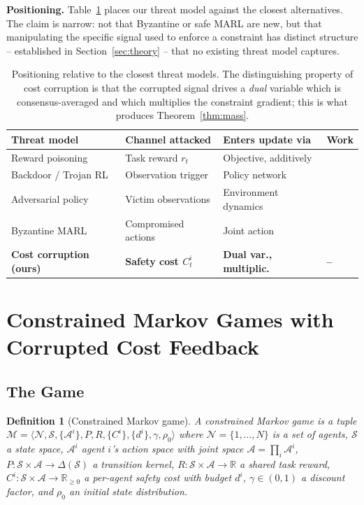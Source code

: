 \documentclass{article}
\newtheorem{definition}{Definition}
\begin{document}
\textbf{Positioning.} Table~\ref{tab:positioning} places our threat model against the closest alternatives. The claim is narrow: not that Byzantine or safe MARL are new, but that manipulating the specific signal used to enforce a constraint has distinct structure -- established in Section~\ref{sec:theory} -- that no existing threat model captures.

\begin{table}[t]
\caption{Positioning relative to the closest threat models. The distinguishing property of cost corruption is that the corrupted signal drives a \emph{dual} variable which is consensus-averaged and which multiplies the constraint gradient; this is what produces Theorem~\ref{thm:mass}.}
\label{tab:positioning}
\centering
\footnotesize
\begin{tabular}{@{}llll@{}}
\toprule
\textbf{Threat model} & \textbf{Channel attacked} & \textbf{Enters update via} & \textbf{Work} \\
\midrule
Reward poisoning & Task reward $r_t$ & Objective, additively & \citep{zhang2020adaptive} \\
Backdoor / Trojan RL & Observation trigger & Policy network & \citep{kiourti2020trojdrl} \\
Adversarial policy & Victim observations & Environment dynamics & \citep{gleave2020adversarial} \\
Byzantine MARL & Compromised actions & Joint action & \citep{li2024byzantine} \\
\textbf{Cost corruption (ours)} & \textbf{Safety cost $C^i_t$} & \textbf{Dual var., multiplic.} & \textbf{--} \\
\bottomrule
\end{tabular}
\end{table}

\section{Constrained Markov Games with Corrupted Cost Feedback}
\label{sec:formulation}

\subsection{The Game}

\begin{definition}[Constrained Markov game]
\label{def:cmg}
A constrained Markov game is a tuple $\mathcal{M} = \langle \mathcal{N}, \mathcal{S}, \{\mathcal{A}^i\}, P, R, \{C^i\}, \{d^i\}, \gamma, \rho_0 \rangle$ where $\mathcal{N} = \{1,\dots,N\}$ is a set of agents, $\mathcal{S}$ a state space, $\mathcal{A}^i$ agent $i$'s action space with joint space $\mathcal{A} = \prod_i \mathcal{A}^i$, $P : \mathcal{S}\times\mathcal{A}\to\Delta(\mathcal{S})$ a transition kernel, $R : \mathcal{S}\times\mathcal{A}\to\mathbb{R}$ a shared task reward, $C^i : \mathcal{S}\times\mathcal{A}\to\mathbb{R}_{\ge 0}$ a per-agent safety cost with budget $d^i$, $\gamma\in(0,1)$ a discount factor, and $\rho_0$ an initial state distribution.
\end{definition}
\end{document}
